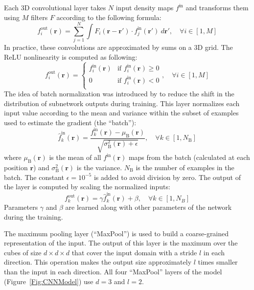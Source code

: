 \documentclass{bioinfo}
\begin{document}
Each 3D convolutional layer takes $N$ input density maps $f^\text{in}$
and transforms them using $M$ filters $F$ according to the following
formula:
\begin{equation}
f^\text{out}_i (\mathbf{r}) = \sum^{N}_{j=1} \int F_i (\mathbf{r} - \mathbf{r'}) \cdot f^\text{in}_j(\mathbf{r'}) ~d\mathbf{r'}, \quad\forall i \in [1,M]
\end{equation}
In practice, these convolutions are approximated by sums on a 3D grid.
The ReLU nonlinearity is computed as following:
\begin{equation}
f^\text{out}_i (\mathbf{r}) = \begin{cases}
               f^\text{in}_i(\mathbf{r}) &\text{if } f^\text{in}_i(\mathbf{r})\geq 0\\
               0                         &\text{if } f^\text{in}_i(\mathbf{r})<0\\
            \end{cases}, \quad\forall i \in [1,M]
\end{equation}
The idea of batch normalization was introduced by 
\citealp{ioffe2015batch} to reduce the shift in the distribution of
subnetwork outputs during training. This layer normalizes each input
value according to the mean and variance within the subset of examples
used to estimate the gradient (the ``batch''):
\begin{equation}
\hat{f}^\text{in}_k(\mathbf{r}) = \frac{f^\text{in}_k(\mathbf{r}) - \mu_\text{B}(\mathbf{r})}{\sqrt{\sigma^{2}_\text{B}(\mathbf{r}) + \epsilon}}, \quad\forall k \in [1,N_\text{B}]
\end{equation}
where $\mu_\text{B}(\mathbf{r})$ is the mean of all
$f^\text{in}(\mathbf{r})$ maps from the batch (calculated at each
position $\mathbf{r}$) and $\sigma^{2}_\text{B}(\mathbf{r})$ is the
variance. $N_\text{B}$ is the number of examples in the batch. The constant
$\epsilon = 10^{-5}$ is added to avoid division by zero.
The output of the layer is computed by scaling the normalized inputs:
\begin{equation}
f^\text{out}_k(\mathbf{r}) = \gamma \hat{f}^\text{in}_k(\mathbf{r}) + \beta, \quad\forall k \in [1,N_B]
\end{equation}
Parameters $\gamma$ and $\beta$ are learned along with other
parameters of the network during the training.

The maximum pooling layer (``MaxPool'') is used to build a
coarse-grained representation of the input. The output of this layer
is the maximum over the cubes of size $d \times d \times d$ that cover
the input domain with a stride $l$ in each direction.  This operation
makes the output size approximately $l$ times smaller than the
input in each direction.  All four ``MaxPool'' layers of the model
(Figure~\ref{Fig:CNNModel}) use $d=3$ and $l=2$.
\end{document}
